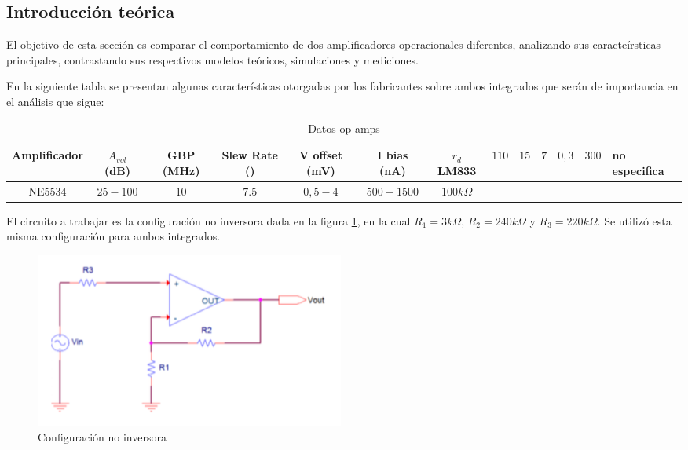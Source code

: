 
\subsection{Introducción teórica}


El objetivo de esta sección es comparar el comportamiento de dos amplificadores operacionales diferentes, analizando sus caracteírsticas principales, contrastando sus respectivos modelos teóricos, simulaciones y mediciones.

En la siguiente tabla se presentan algunas características otorgadas por los fabricantes sobre ambos integrados que serán de importancia en el  análisis que sigue:


\begin{table}[H]
\begin{center}
\begin{tabular}{|c|c|c|c|c|c|c|}
\hline
Amplificador   & $A_{vol}$ (dB)   & GBP (MHz)   & Slew Rate ()   & V offset (mV)  & I bias (nA)  & $r_d$ %
LM833 &  $110$ & $15$ & $7$   & $0,3$  & $300$ & no especifica \\ \hline
NE5534 & $25-100$    & $10$  & $7.5$   & $0,5-4$  & $500-1500$&  $100k\Omega$
\\ \hline
\end{tabular}
\caption{Datos op-amps}
\label{tabla:caracteristicas_amps}
\end{center}
\end{table}

El circuito a trabajar es la configuración no inversora dada en la figura \ref{fig:consigna}, en la cual $R_1 = 3k \Omega$, $R_2 = 240k \Omega$ y $R_3 = 220k \Omega$. Se utilizó esta misma configuración para ambos integrados.  


\begin{figure}[H]	
	\centering
	\includegraphics[width=\textwidth]{Ejercicio2/Imagenes/circuito_consigna.png}
	\caption{Configuración no inversora}
	\label{fig:consigna}
\end{figure}


